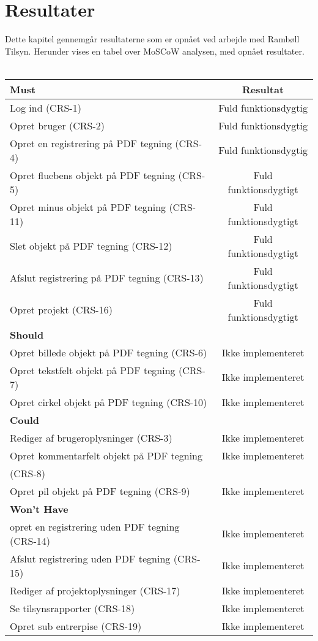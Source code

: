 \chapter{Resultater}
Dette kapitel gennemgår resultaterne som er opnået ved arbejde med Rambøll Tilsyn. Herunder vises en tabel over MoSCoW analysen, med opnået resultater.\\ \\
\begin{tabular}{ l | c  }
	\hline
	\textbf{Must} & \textbf{Resultat} \\ \hline
	Log ind (CRS-1) & Fuld funktionsdygtig \\
	\hline
	Opret bruger (CRS-2) & Fuld funktionsdygtig \\
	\hline
	Opret en registrering på PDF tegning (CRS-4) & Fuld funktionsdygtig\\
	\hline
	Opret fluebens objekt på PDF tegning (CRS-5) & Fuld funktionsdygtigt\\
	\hline
	Opret minus objekt på PDF tegning (CRS-11) & Fuld funktionsdygtigt\\
	\hline
	Slet objekt på PDF tegning (CRS-12) & Fuld funktionsdygtigt\\
	\hline
	Afslut registrering på PDF tegning (CRS-13) & Fuld funktionsdygtigt\\
	\hline
	Opret projekt (CRS-16) & Fuld funktionsdygtigt\\
	\hline
	\hline
	\textbf{Should} &  \\ \hline
	Opret billede objekt på PDF tegning (CRS-6) & Ikke implementeret\\
	\hline
	Opret tekstfelt objekt på PDF tegning (CRS-7) & Ikke implementeret\\
	\hline
	Opret cirkel objekt på PDF tegning (CRS-10) & Ikke implementeret\\
	\hline
	\hline
	\textbf{Could} &  \\ \hline
	Rediger af brugeroplysninger (CRS-3) & Ikke implementeret\\
	\hline
	Opret kommentarfelt objekt på PDF tegning   & Ikke implementeret\\
	(CRS-8) & \\
	\hline
	Opret pil objekt på PDF tegning (CRS-9) & Ikke implementeret\\
	\hline
	\hline
	\textbf{Won't Have} & \\ \hline
	opret en registrering uden PDF tegning (CRS-14) & Ikke implementeret\\
	\hline
	Afslut registrering uden PDF tegning (CRS-15) & Ikke implementeret\\
	\hline
	Rediger af projektoplysninger (CRS-17) & Ikke implementeret\\
	\hline
	Se tilsynsrapporter (CRS-18) & Ikke implementeret\\
	\hline
	Opret sub entrerpise (CRS-19) & Ikke implementeret\\
	\hline
\end{tabular} \\


